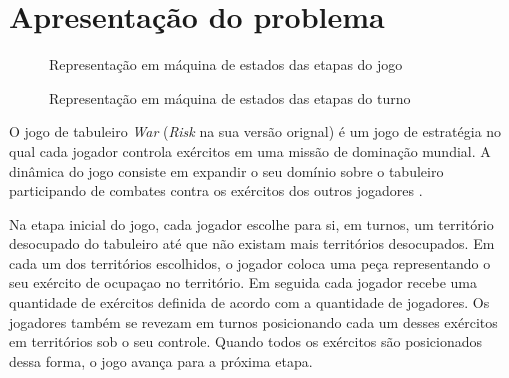 \documentclass[rel_mlp]{iiufrgs}
\numberwithin{figure}{chapter}
\begin{document}
\chapter{Apresentação do problema}

\begin{figure}
\caption{Representação em máquina de estados das etapas do jogo}
\label{fig:smGame}
\end{figure}

\begin{figure}
\caption{Representação em máquina de estados das etapas do turno}
\label{fig:smTurn}
\end{figure}

O jogo de tabuleiro \textit{War} (\textit{Risk} na sua versão orignal) é um jogo de estratégia no qual cada jogador controla exércitos em uma missão de dominação mundial. A dinâmica do jogo consiste em expandir o seu domínio sobre o tabuleiro participando de combates contra os exércitos dos outros jogadores \cite{riskMan}.

Na etapa inicial do jogo, cada jogador escolhe para si, em turnos, um território desocupado do tabuleiro até que não existam mais territórios desocupados. Em cada um dos territórios escolhidos, o jogador coloca uma peça representando o seu exército de ocupaçao no território. Em seguida cada jogador recebe uma quantidade de exércitos definida de acordo com a quantidade de jogadores. Os jogadores também se revezam em turnos posicionando cada um desses exércitos em territórios sob o seu controle. Quando todos os exércitos são posicionados dessa forma, o jogo avança para a próxima etapa.
\end{document}
